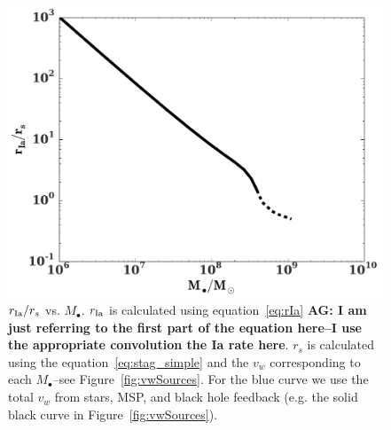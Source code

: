 \documentclass[usenatbib,fleqn]{mn2e}
\newcommand\lsim{\mathrel{\rlap{\lower4pt\hbox{\hskip1pt$\sim$}}
    \raise1pt\hbox{$<$}}}
\newcommand{\rs}{r_s}
\newcommand{\Mbh}[1][]{M_{\bullet#1}}
\newcommand{\rIa}{r_{\rm Ia}}
\newcommand{\vwO}{v_{w}}
\newcommand{\tage}{t_{\star}}
\begin{document}


\begin{figure}
\includegraphics[width=\columnwidth]{rs_rIa.pdf}
\caption{\label{fig:rs_rIa} $\rIa/\rs$ vs. $\Mbh$. $\rIa$ is
  calculated using equation~\eqref{eq:rIa} {\bf AG: I am just
    referring to the first part of the equation here--I use the
    appropriate convolution the Ia rate here}. $\rs$ is calculated
  using the equation~\eqref{eq:stag_simple} and the $\vwO$
  corresponding to each $\Mbh$--see Figure~\ref{fig:vwSources}. For
  the blue curve we use the total $\vwO$ from stars, MSP, and
  black hole feedback (e.g. the solid black curve in
  Figure~\ref{fig:vwSources}).}
\end{figure}

\end{document}
